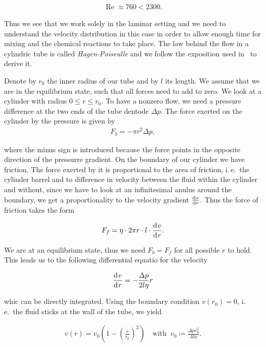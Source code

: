 \begin{align*}
  \operatorname{Re} \approx 760 < 2300.
\end{align*}

Thus we see that we work solely in the laminar setting and we need to
understand the velocity distribution in this case in order to allow
enough time for mixing and the chemical reactions to take place. The
law behind the flow in a cylindric tube is called
\emph{Hagen-Poiseulle} and we follow the exposition used
in~\cite{gerthsen} to derive it.

Denote by $r_0$ the inner radius of our tube and by $l$ its length. We
assume that we are in the equilibrium state, such that all forces need
to add to zero. We look at a cylinder with radius $0 \leq r \leq
r_0$. To have a nonzero flow, we need a pressure difference at the two
ends of the tube dentode $\Delta p$. The force exerted on the cylinder
by the pressure is given by
\begin{align*}
  F_b = - \pi r^2 \Delta p,
\end{align*}

where the minus sign is introduced because the force points in the
opposite direction of the pressurre gradient. On the boundary of our
cylinder we have friction. The force exerted by 
it is proportional to the area of friction, i.\,e.\ the cylinder
barrel and to difference in velocity between the fluid within the
cylinder and without, since we have to look at an infinitesimal anulus
around the boundary, we get a proportionality to the velocity gradient
$\frac{\d[v]}{\d[r]}$. Thus the force of friction takes the form

\begin{align*}
  F_f = \eta \cdot 2\pi r \cdot l \cdot \frac{\d[v]}{\d[r]}.
\end{align*}

We are at an equilibrium state, thus we need $F_b = F_f$ for all
possible $r$ to hold. This leads us to the following differential
equatio for the velocity

\begin{align*}
  \frac{\d[v]}{\d[r]} = - \frac{\Delta p}{2l\eta} r
\end{align*}
 
whic can be directly integrated. Using the boundary condition $v(r_0)
= 0$, i.\,e.\ the fluid sticks at the wall of the tube, we yield

\begin{align}
  v(r) = v_0 \left ( 1 - \left( \frac{r}{r_0} \right)^2 \right) \quad
  \text{with }\ v_0 \coloneqq \frac{\Delta p r_0^2}{4 l \eta}. \label{eq:v}
\end{align}

